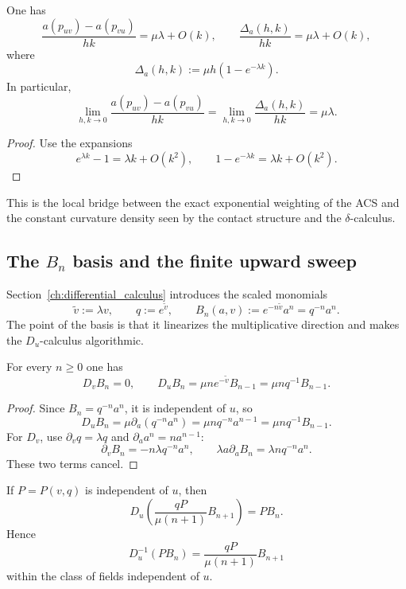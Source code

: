\begin{corollary}
\label{cor:appD-infinitesimal-density}
One has
\[
\frac{a(p_{uv})-a(p_{vu})}{hk}=\mu\lambda+O(k),
\qquad
\frac{\Delta_a(h,k)}{hk}=\mu\lambda+O(k),
\]
where
\[
\Delta_a(h,k):=\mu h(1-e^{-\lambda k}).
\]
In particular,
\[
\lim_{h,k\to 0}\frac{a(p_{uv})-a(p_{vu})}{hk}
=
\lim_{h,k\to 0}\frac{\Delta_a(h,k)}{hk}
=\mu\lambda.
\]
\end{corollary}

\begin{proof}
Use the expansions
\[
e^{\lambda k}-1=\lambda k+O(k^2),
\qquad
1-e^{-\lambda k}=\lambda k+O(k^2).
\]
\end{proof}

This is the local bridge between the exact exponential weighting of the ACS and the constant curvature density seen by the contact structure and the $\delta$-calculus.

\subsection{The \texorpdfstring{$B_n$}{Bn} basis and the finite upward sweep}
\label{appD:Bn-basis-upward-sweep}

Section~\ref{ch:differential_calculus} introduces the scaled monomials
\[
\tilde v:=\lambda v,
\qquad
q:=e^{\tilde v},
\qquad
B_n(a,v):=e^{-n\tilde v}a^n=q^{-n}a^n.
\]
The point of the basis is that it linearizes the multiplicative direction and makes the $D_u$-calculus algorithmic.

\begin{lemma}
\label{lem:appD-Bn-actions}
For every $n\ge 0$ one has
\[
D_vB_n=0,
\qquad
D_uB_n=\mu n e^{-\tilde v}B_{n-1}=\mu n q^{-1}B_{n-1}.
\]
\end{lemma}

\begin{proof}
Since $B_n=q^{-n}a^n$, it is independent of $u$, so
\[
D_uB_n=\mu\partial_a(q^{-n}a^n)=\mu n q^{-n}a^{n-1}=\mu n q^{-1}B_{n-1}.
\]
For $D_v$, use $\partial_v q=\lambda q$ and $\partial_a a^n=na^{n-1}$:
\[
\partial_vB_n=-n\lambda q^{-n}a^n,
\qquad
\lambda a\partial_aB_n=\lambda n q^{-n}a^n.
\]
These two terms cancel.
\end{proof}

\begin{lemma}
\label{lem:appD-one-step-antiderivative}
If $P=P(v,q)$ is independent of $u$, then
\[
D_u\!\left(\frac{qP}{\mu(n+1)}B_{n+1}\right)=PB_n.
\]
Hence
\[
D_u^{-1}(PB_n)=\frac{qP}{\mu(n+1)}B_{n+1}
\]
within the class of fields independent of $u$.
\end{lemma}

